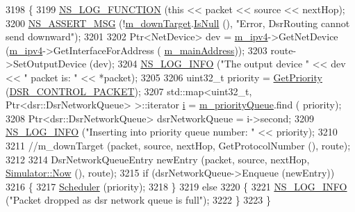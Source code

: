 \begin{DoxyCode}
3198 \{
3199   \hyperlink{log-macros-disabled_8h_a90b90d5bad1f39cb1b64923ea94c0761}{NS\_LOG\_FUNCTION} (\textcolor{keyword}{this} << packet << source << nextHop);
3200   \hyperlink{assert_8h_aff5ece9066c74e681e74999856f08539}{NS\_ASSERT\_MSG} (!\hyperlink{classns3_1_1dsr_1_1DsrRouting_aa1eb6ea60fdf9ba2cac2079a74ce1ca4}{m\_downTarget}.\hyperlink{classns3_1_1Callback_aa8e27826badbf37f84763f36f70d9b54}{IsNull} (), \textcolor{stringliteral}{"Error, DsrRouting cannot send
       downward"});
3201 
3202   Ptr<NetDevice> dev = \hyperlink{classns3_1_1dsr_1_1DsrRouting_aa42c1b9ee27c8168a2141d3d032006c3}{m\_ipv4}->GetNetDevice (\hyperlink{classns3_1_1dsr_1_1DsrRouting_aa42c1b9ee27c8168a2141d3d032006c3}{m\_ipv4}->GetInterfaceForAddress (
      \hyperlink{classns3_1_1dsr_1_1DsrRouting_a73182b5edee2d8460f28855e058fc9a0}{m\_mainAddress}));
3203   route->SetOutputDevice (dev);
3204   \hyperlink{group__logging_gafbd73ee2cf9f26b319f49086d8e860fb}{NS\_LOG\_INFO} (\textcolor{stringliteral}{"The output device "} << dev << \textcolor{stringliteral}{" packet is: "} << *packet);
3205 
3206   uint32\_t priority = \hyperlink{classns3_1_1dsr_1_1DsrRouting_a67d111b0188b6e2210d1b4782820f8e3}{GetPriority} (\hyperlink{namespacens3_1_1dsr_a7c80bcec67d78dc149a0e503014d07c5abeaa53bf31d961c221e4e377ef6022f2}{DSR\_CONTROL\_PACKET});
3207   std::map<uint32\_t, Ptr<dsr::DsrNetworkQueue> >::iterator \hyperlink{bernuolliDistribution_8m_a6f6ccfcf58b31cb6412107d9d5281426}{i} = \hyperlink{classns3_1_1dsr_1_1DsrRouting_a4606c3dfb1099afbfe1e7cd1d1c3c8ee}{m\_priorityQueue}.find (
      priority);
3208   Ptr<dsr::DsrNetworkQueue> dsrNetworkQueue = i->second;
3209   \hyperlink{group__logging_gafbd73ee2cf9f26b319f49086d8e860fb}{NS\_LOG\_INFO} (\textcolor{stringliteral}{"Inserting into priority queue number: "} << priority);
3210 
3211   \textcolor{comment}{//m\_downTarget (packet, source, nextHop, GetProtocolNumber (), route);}
3212 
3214  DsrNetworkQueueEntry newEntry (packet, source, nextHop, \hyperlink{classns3_1_1Simulator_ac3178fa975b419f7875e7105be122800}{Simulator::Now} (), route);
3215  \textcolor{keywordflow}{if} (dsrNetworkQueue->Enqueue (newEntry))
3216    \{
3217      \hyperlink{classns3_1_1dsr_1_1DsrRouting_aa518edb174bccce1062304404424c6e0}{Scheduler} (priority);
3218    \}
3219  \textcolor{keywordflow}{else}
3220    \{
3221      \hyperlink{group__logging_gafbd73ee2cf9f26b319f49086d8e860fb}{NS\_LOG\_INFO} (\textcolor{stringliteral}{"Packet dropped as dsr network queue is full"});
3222    \}
3223 \}
\end{DoxyCode}


